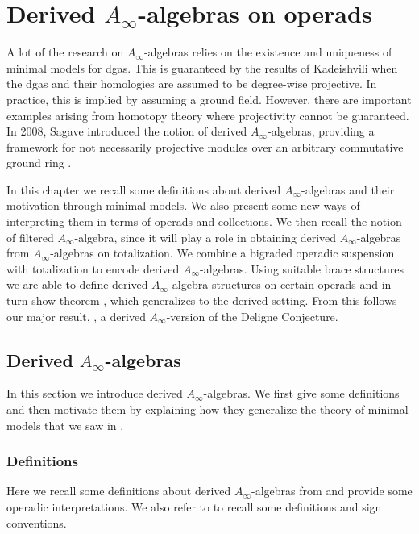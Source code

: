 \documentclass[Thesis.tex]{subfiles}
\begin{document}
\chapter{Derived $A_\infty$-algebras on operads}\label{deriveddef}
A lot of the research on $A_\infty$-algebras relies on the existence and uniqueness of minimal models for dgas. This is guaranteed by the results of Kadeishvili \cite{kade} when the dgas and their homologies are assumed to be degree-wise projective. In practice, this is implied by assuming a ground field. However, there are important examples arising from homotopy theory where projectivity cannot be guaranteed. In 2008, Sagave introduced the notion of derived $A_\infty$-algebras, providing a framework for not necessarily projective modules over an arbitrary commutative ground ring \cite{sagave}.

In this chapter we recall some definitions about derived $A_\infty$-algebras and their motivation through minimal models. We also present some new ways of interpreting them in terms of operads and collections. We then recall the notion of filtered $A_\infty$-algebra, since it will play a role in obtaining derived $A_\infty$-algebras from $A_\infty$-algebras on totalization. We combine a bigraded operadic suspension with totalization to encode derived $A_\infty$-algebras. Using suitable brace structures we are able to define derived $A_\infty$-algebra structures on certain operads and in turn show theorem , which generalizes  to the derived setting. From this follows our major result, , a derived $A_\infty$-version of the Deligne Conjecture.


\section{Derived $A_\infty$-algebras}
In this section we introduce derived $A_\infty$-algebras. We first give some definitions and then motivate them by explaining how they generalize the theory of minimal models that we saw in . 

\subsection{Definitions}
Here we recall some definitions about derived $A_\infty$-algebras from \cite{sagave} and provide some operadic interpretations. We also refer to  to recall some definitions and sign conventions.
\end{document}
